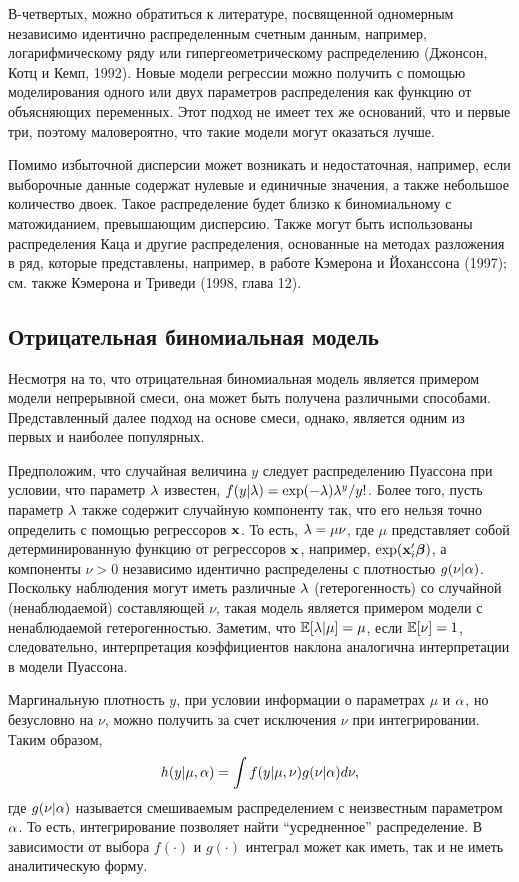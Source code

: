 В-четвертых, можно обратиться к литературе, посвященной одномерным независимо идентично распределенным счетным данным, например, логарифмическому ряду или гипергеометрическому распределению (Джонсон, Котц и Кемп, 1992). Новые модели регрессии можно получить с помощью моделирования одного или двух параметров распределения как функцию от объясняющих переменных. Этот подход не имеет тех же оснований, что и первые три, поэтому маловероятно, что такие модели могут оказаться лучше.

Помимо избыточной дисперсии может возникать и недостаточная, например, если выборочные данные содержат нулевые и единичные значения, а также небольшое количество двоек. Такое распределение будет близко к биномиальному с матожиданием, превышающим дисперсию. Также могут быть использованы распределения Каца и другие распределения, основанные на методах разложения в ряд, которые представлены, например, в работе Кэмерона и Йоханссона (1997); см. также Кэмерона и Триведи (1998, глава 12).


\subsection{Отрицательная биномиальная модель}\label{sec:20.4.1}

\noindent
Несмотря на то, что отрицательная биномиальная модель является примером модели непрерывной смеси, она может быть получена различными способами. Представленный далее подход на основе смеси, однако, является одним из первых и наиболее популярных.

Предположим, что случайная величина $y$ следует распределению Пуассона при условии, что параметр $\lambda$ известен, $f(y|\lambda) = \exp(-\lambda)\lambda^y/y!$. Более того, пусть параметр $\lambda$ также содержит случайную компоненту так, что его нельзя точно определить с помощью регрессоров $\mathbf{x}$. То есть, $\lambda = \mu\nu$, где $\mu$ представляет собой детерминированную функцию от регрессоров $\mathbf{x}$, например, $\exp(\mathbf{x}_i'\bm{\beta})$, а компоненты $\nu > 0$ независимо идентично распределены с плотностью $g(\nu|\alpha)$. Поскольку наблюдения могут иметь различные $\lambda$ (гетерогенность) со случайной (ненаблюдаемой) составляющей $\nu$, такая модель является примером модели с ненаблюдаемой гетерогенностью. Заметим, что $\mathbb{E}[\lambda|\mu] = \mu$, если $\mathbb{E}[\nu] = 1$, следовательно, интерпретация коэффициентов наклона аналогична интерпретации в модели Пуассона.

Маргинальную плотность $y$, при условии информации о параметрах $\mu$ и $\alpha$, но безусловно на $\nu$, можно получить за счет исключения $\nu$ при интегрировании. Таким образом,
    \begin{align}\label{eq:20.11}
    h(y|\mu,\alpha) = \int f(y|\mu, \nu) g(\nu|\alpha) d\nu,
    \end{align}
где $g(\nu|\alpha)$ называется смешиваемым распределением с неизвестным параметром $\alpha$. То есть, интегрирование позволяет найти ``усредненное'' распределение. В зависимости от выбора $f(\cdot)$ и $g(\cdot)$ интеграл может как иметь, так и не иметь аналитическую форму.

